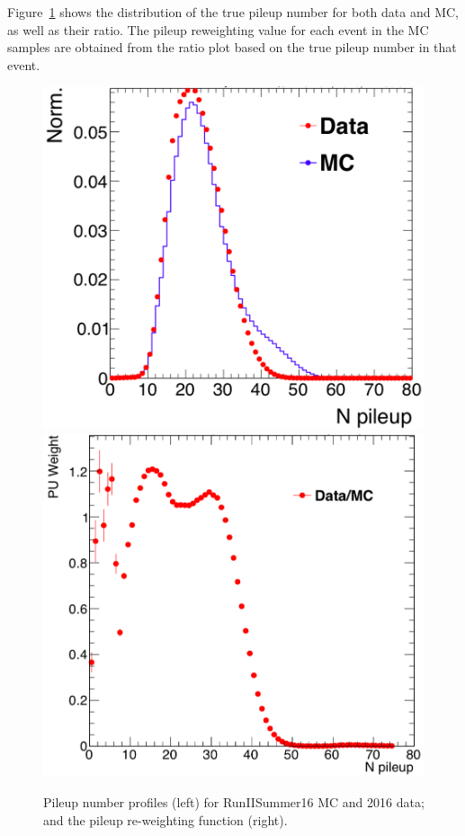 \vspace{0.3cm}
Figure~\ref{fig:bg_pileup} shows the distribution of the true pileup number for both data and MC, as well as their ratio. The pileup reweighting value for each event in the MC samples are obtained from the ratio plot based on the true pileup number in that event.

\begin{figure}[htbp]
\begin{center}
\includegraphics[width=0.9\linewidth]{figures/bg_Npileup.png}
\includegraphics[width=0.9\linewidth]{figures/bg_pileupratio.png}
\caption{Pileup number profiles (left) for RunIISummer16 MC and 2016 data; and the pileup re-weighting function (right).}
\label{fig:bg_pileup}
\end{center}
\end{figure}

